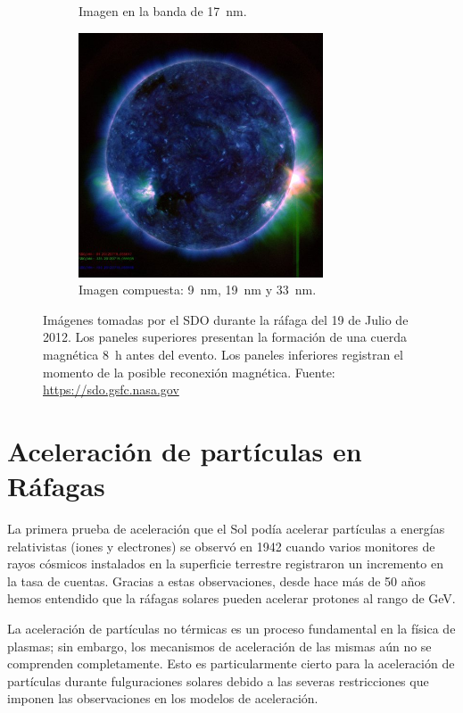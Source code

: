 \begin{figure}
\begin{subfigure}[b]{0.49\textwidth}
                \caption*{Imagen en la banda de \SI{17}{\nano\metre}.}
        \end{subfigure}
        \begin{subfigure}[b]{0.49\textwidth}
                \includegraphics[width=7.25cm]{sdo120719-0555-c}
                \caption*{Imagen compuesta: \SI{9}{\nano\metre}, \SI{19}{\nano\metre} y \SI{33}{\nano\metre}.}
        \end{subfigure}
        \caption{Imágenes tomadas por el SDO durante la ráfaga del \num{19} de Julio de \num{2012}. Los paneles superiores presentan la formación de una cuerda magnética \SI{8}{\hour} antes del evento. Los paneles inferiores registran el momento de la posible reconexión magnética. Fuente: \url{https://sdo.gsfc.nasa.gov}}
        \label{fig:flare-euv}
\end{figure}

\section{Aceleración de partículas en Ráfagas}

La primera prueba de aceleración que el Sol podía acelerar partículas a energías relativistas (iones y electrones) se observó en \num{1942} cuando varios monitores de rayos cósmicos instalados en la superficie terrestre registraron un incremento en la tasa de cuentas. Gracias a estas observaciones, desde hace más de \num{50} años hemos entendido que la ráfagas solares pueden acelerar protones al rango de \si{\giga\electronvolt}.

La aceleración de partículas no térmicas es un proceso fundamental en la física de plasmas; sin embargo, los mecanismos de aceleración de las mismas aún no se comprenden completamente. Esto es particularmente cierto para la aceleración de partículas durante fulguraciones solares debido a las severas restricciones que imponen las observaciones en los modelos de aceleración.


